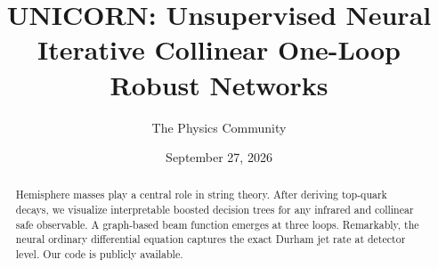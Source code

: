 \documentclass[11pt]{article}
\title{UNICORN: Unsupervised Neural Iterative Collinear One-Loop Robust Networks}
\author{The Physics Community}
\date{September 27, 2026}
\numberwithin{equation}{section}
\theoremstyle{definition}
\theoremstyle{remark}
\begin{document}
\maketitle
\begin{abstract}
Hemisphere masses play a central role in string theory. After deriving
top-quark decays, we visualize interpretable boosted decision trees for
any infrared and collinear safe observable. A graph-based beam function
emerges at three loops. Remarkably, the neural ordinary differential
equation captures the exact Durham jet rate at detector level. Our code
is publicly available.
\end{abstract}
\tableofcontents




\nocite{*}


\end{document}

